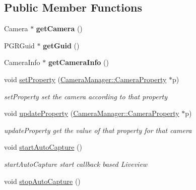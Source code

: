 \subsection*{Public Member Functions}
\begin{DoxyCompactItemize}
\item 
\hypertarget{class_is_camera_ab1f39bed7530f03cf07c3ae6c53d045e}{Camera $\ast$ {\bfseries get\-Camera} ()}\label{class_is_camera_ab1f39bed7530f03cf07c3ae6c53d045e}

\item 
\hypertarget{class_is_camera_a08a1845f52db3f52fae52aa2ce63783b}{P\-G\-R\-Guid $\ast$ {\bfseries get\-Guid} ()}\label{class_is_camera_a08a1845f52db3f52fae52aa2ce63783b}

\item 
\hypertarget{class_is_camera_acfd929b7612162a9897f0be21b2bea4f}{Camera\-Info $\ast$ {\bfseries get\-Camera\-Info} ()}\label{class_is_camera_acfd929b7612162a9897f0be21b2bea4f}

\item 
void \hyperlink{class_is_camera_a70c90a32bde9fcc3c594a526c7cba33c}{set\-Property} (\hyperlink{class_camera_manager_1_1_camera_property}{Camera\-Manager\-::\-Camera\-Property} $\ast$p)
\begin{DoxyCompactList}\small\item\em set\-Property set the camera according to that property \end{DoxyCompactList}\item 
void \hyperlink{class_is_camera_a5e2c484168c627eb79d61658e880300d}{update\-Property} (\hyperlink{class_camera_manager_1_1_camera_property}{Camera\-Manager\-::\-Camera\-Property} $\ast$p)
\begin{DoxyCompactList}\small\item\em update\-Property get the value of that property for that camera \end{DoxyCompactList}\item 
\hypertarget{class_is_camera_ad272b7a566ab9d226c96b331a0e8b5ab}{void \hyperlink{class_is_camera_ad272b7a566ab9d226c96b331a0e8b5ab}{start\-Auto\-Capture} ()}\label{class_is_camera_ad272b7a566ab9d226c96b331a0e8b5ab}

\begin{DoxyCompactList}\small\item\em start\-Auto\-Capture start callback based Liveview \end{DoxyCompactList}\item 
\hypertarget{class_is_camera_a71a1959c599bb6f296dc59965a41b8c7}{void \hyperlink{class_is_camera_a71a1959c599bb6f296dc59965a41b8c7}{stop\-Auto\-Capture} ()}\label{class_is_camera_a71a1959c599bb6f296dc59965a41b8c7}


\end{DoxyCompactItemize}
